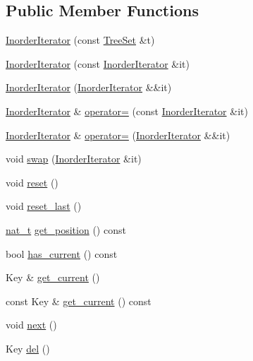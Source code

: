 \subsection*{Public Member Functions}
\begin{DoxyCompactItemize}
\item 
\hyperlink{class_designar_1_1_tree_set_1_1_inorder_iterator_ad5ff37d7f6ed8284dc3ce396cbdc4f86}{Inorder\+Iterator} (const \hyperlink{class_designar_1_1_tree_set}{Tree\+Set} \&t)
\item 
\hyperlink{class_designar_1_1_tree_set_1_1_inorder_iterator_a010cfd17e2ad8031981ea3688f89f545}{Inorder\+Iterator} (const \hyperlink{class_designar_1_1_tree_set_1_1_inorder_iterator}{Inorder\+Iterator} \&it)
\item 
\hyperlink{class_designar_1_1_tree_set_1_1_inorder_iterator_aa4b81ce7770abb8f488099fd5abb1a02}{Inorder\+Iterator} (\hyperlink{class_designar_1_1_tree_set_1_1_inorder_iterator}{Inorder\+Iterator} \&\&it)
\item 
\hyperlink{class_designar_1_1_tree_set_1_1_inorder_iterator}{Inorder\+Iterator} \& \hyperlink{class_designar_1_1_tree_set_1_1_inorder_iterator_a4eca124737c8f5664deafc3b19f17e46}{operator=} (const \hyperlink{class_designar_1_1_tree_set_1_1_inorder_iterator}{Inorder\+Iterator} \&it)
\item 
\hyperlink{class_designar_1_1_tree_set_1_1_inorder_iterator}{Inorder\+Iterator} \& \hyperlink{class_designar_1_1_tree_set_1_1_inorder_iterator_a2b0a20a5a81ee8d54929a035df77e95c}{operator=} (\hyperlink{class_designar_1_1_tree_set_1_1_inorder_iterator}{Inorder\+Iterator} \&\&it)
\item 
void \hyperlink{class_designar_1_1_tree_set_1_1_inorder_iterator_ac3d6fc72f50addc10c0c99b533448a9a}{swap} (\hyperlink{class_designar_1_1_tree_set_1_1_inorder_iterator}{Inorder\+Iterator} \&it)
\item 
void \hyperlink{class_designar_1_1_tree_set_1_1_inorder_iterator_a7a5ce683413135445a1d7a064ae7d70c}{reset} ()
\item 
void \hyperlink{class_designar_1_1_tree_set_1_1_inorder_iterator_ae6a74511239f69caf43e92f915f8c605}{reset\+\_\+last} ()
\item 
\hyperlink{namespace_designar_aa72662848b9f4815e7bf31a7cf3e33d1}{nat\+\_\+t} \hyperlink{class_designar_1_1_tree_set_1_1_inorder_iterator_a32fceb8d4318ee6c11c07c1b02b93635}{get\+\_\+position} () const
\item 
bool \hyperlink{class_designar_1_1_tree_set_1_1_inorder_iterator_ae83dae23b6d48b2ccec38c7e22d01fd0}{has\+\_\+current} () const
\item 
Key \& \hyperlink{class_designar_1_1_tree_set_1_1_inorder_iterator_a48d0738cf18aa20c4a6161841324443d}{get\+\_\+current} ()
\item 
const Key \& \hyperlink{class_designar_1_1_tree_set_1_1_inorder_iterator_aad3ec85d58308071d6589fdbb258bdf6}{get\+\_\+current} () const
\item 
void \hyperlink{class_designar_1_1_tree_set_1_1_inorder_iterator_a850f1ca2e5a49dc43fddc09e2cc43659}{next} ()
\item 
Key \hyperlink{class_designar_1_1_tree_set_1_1_inorder_iterator_a137c29da7611999490f4a10a898b3c1d}{del} ()
\end{DoxyCompactItemize}
